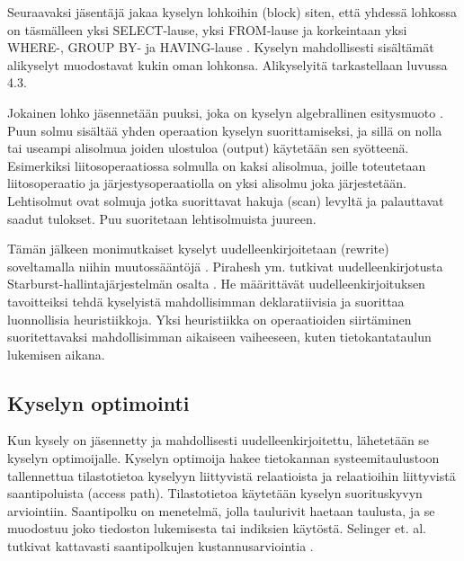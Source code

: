 \documentclass[finnish]{tktltiki2}
\theoremstyle{definition}
\theoremstyle{remark}
\begin{document}
Seuraavaksi jäsentäjä jakaa kyselyn lohkoihin (block) siten, että yhdessä lohkossa on täsmälleen yksi SELECT-lause, yksi FROM-lause ja korkeintaan yksi WHERE-, GROUP BY- ja HAVING-lause \cite{ramakrishnan2003database}. 
Kyselyn mahdollisesti sisältämät alikyselyt muodostavat kukin oman lohkonsa. Alikyselyitä tarkastellaan luvussa 4.3.

Jokainen lohko jäsennetään puuksi, joka on kyselyn algebrallinen esitysmuoto \cite{mahajan2012}. 
Puun solmu sisältää yhden operaation kyselyn suorittamiseksi, ja sillä on nolla tai useampi alisolmua joiden ulostuloa (output) käytetään sen syötteenä.
Esimerkiksi liitosoperaatiossa solmulla on kaksi alisolmua, joille toteutetaan liitosoperaatio ja järjestysoperaatiolla on yksi alisolmu joka järjestetään.
Lehtisolmut ovat solmuja jotka suorittavat hakuja (scan) levyltä ja palauttavat saadut tulokset. 
Puu suoritetaan lehtisolmuista juureen.

Tämän jälkeen monimutkaiset kyselyt uudelleenkirjoitetaan (rewrite) soveltamalla niihin muutossääntöjä \cite{ioannidis1996query}. Pirahesh ym. tutkivat uudelleenkirjotusta Starburst-hallintajärjestelmän osalta \cite{pirahesh1992extensible}. He määrittävät uudelleenkirjoituksen tavoitteiksi tehdä kyselyistä mahdollisimman deklaratiivisia ja suorittaa luonnollisia heuristiikkoja. Yksi heuristiikka on operaatioiden siirtäminen suoritettavaksi mahdollisimman aikaiseen vaiheeseen, kuten tietokantataulun lukemisen aikana.


\subsection{Kyselyn optimointi}
Kun kysely on jäsennetty ja mahdollisesti uudelleenkirjoitettu, lähetetään se kyselyn optimoijalle. Kyselyn optimoija hakee tietokannan systeemitaulustoon tallennettua tilastotietoa kyselyyn liittyvistä relaatioista ja relaatioihin liittyvistä saantipoluista (access path). Tilastotietoa käytetään kyselyn suorituskyvyn arviointiin. Saantipolku on menetelmä, jolla taulurivit haetaan taulusta, ja se muodostuu joko tiedoston lukemisesta tai indiksien käytöstä. Selinger et. al. tutkivat kattavasti saantipolkujen kustannusarviointia \cite{selinger1979access}.
\end{document}
